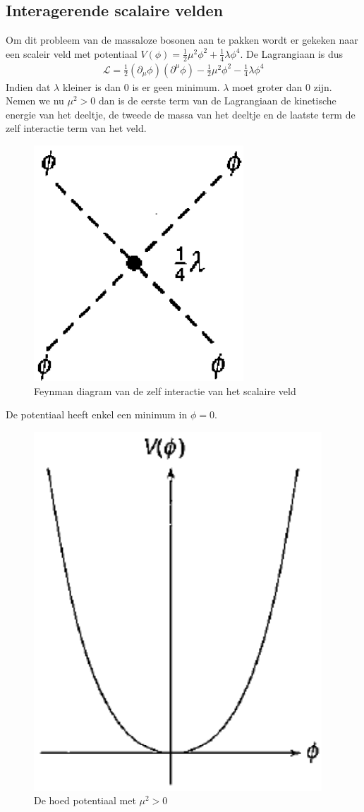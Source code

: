 \documentclass[../main.tex]{subfiles}
\begin{document}
\subsection{Interagerende scalaire velden}%
\label{sub:interagerende_scalaire_velden}

Om dit probleem van de massaloze bosonen aan te pakken wordt er gekeken naar een scaleir veld met potentiaal $V(\phi) = \frac{1}{2}\mu^2\phi^2+\frac{1}{4}\lambda\phi^4$. De Lagrangiaan is dus
\begin{equation}
    \begin{aligned}
        \label{eq:lagr_hoed_pot}
        \mathcal{L} = \frac{1}{2} (\partial_\mu \phi) (\partial^\mu \phi) - \frac{1}{2} \mu^2 \phi^2 - \frac{1}{4} \lambda \phi^4
    \end{aligned}
\end{equation}
Indien dat $\lambda$ kleiner is dan 0 is er geen minimum. $\lambda$ moet groter dan 0 zijn. Nemen we nu $\mu^2>0$ dan is de eerste term van de Lagrangiaan de kinetische energie van het deeltje, de tweede de massa van het deeltje en de laatste term de zelf interactie term van het veld.\newpage

\begin{figure}[h]
    \centering
    \includegraphics[width=0.2\linewidth]{higgs_boson/zelf_int_term_scal.png}
    \caption{Feynman diagram van de zelf interactie van het scalaire veld}%
    \label{fig:higgs_boson/zelf_int_term_scal}
\end{figure}

De potentiaal heeft enkel een minimum in $\phi=0$.

\begin{figure}[h]
    \centering
    \includegraphics[width=0.2\linewidth]{higgs_boson/hoed_pot_1.png}
    \caption{De hoed potentiaal met $\mu^2>0$}%
    \label{fig:higgs_boson/hoed_pot_1}
\end{figure}
\end{document}
